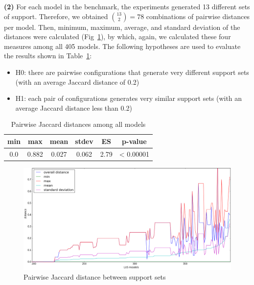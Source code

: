 \textbf{(2)} For each model in the benchmark, the experiments generated 13 different sets of support. Therefore, we obtained $\binom{13}{2} = 78$ combinations of pairwise distances per model. Then, minimum, maximum, average, and standard deviation of the distances were calculated (Fig~\ref{fig:jacdis}), by which, again, we calculated these four measures among all 405 models. The following hypotheses are used to evaluate the results shown in Table~\ref{tab:78com}:
\begin{itemize}
  \item H0: there are pairwise configurations that generate very different support sets (with an average Jaccard distance of 0.2)
  \item H1: each pair of configurations generates very similar support sets (with an average Jaccard distance less than 0.2)
\end{itemize}

\begin{table}
  \centering
  \begin{tabular}{ |c|c|c|c|c|c| }
    \hline
     min & max & mean & stdev & ES & p-value\\[0.5ex]
    \hline
     0.0   & 0.882 & 0.027 & 0.062 & 2.79 & < 0.00001 \\[0.5ex]
    \hline
  \end{tabular}
  \caption{Pairwise Jaccard distances among all models}
  \label{tab:78com}
\end{table}


\begin{figure}
  \centering
  \includegraphics[width=\columnwidth]{figs/jacdis2.png}
  \caption{Pairwise Jaccard distance between support sets}\label{fig:jacdis}
\end{figure}


